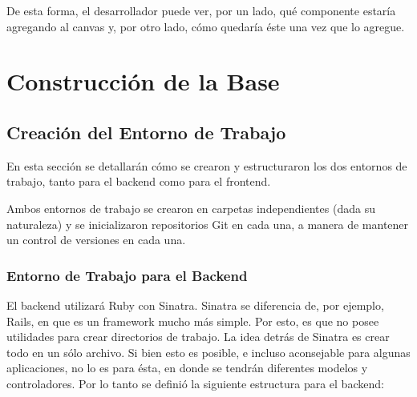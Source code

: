 \documentclass[12pt,spanish,letter]{report}
\begin{document}
De esta forma, el desarrollador puede ver, por un lado, qué componente
estaría agregando al canvas y, por otro lado, cómo quedaría éste una vez
que lo agregue.

\section{Construcción de la Base}

\label{section:first-stage}

\subsection{Creación del Entorno de Trabajo}

En esta sección se detallarán cómo se crearon y estructuraron los dos
entornos de trabajo, tanto para el backend como para el frontend.

Ambos entornos de trabajo se crearon en carpetas independientes (dada su
naturaleza) y se inicializaron repositorios Git en cada una, a manera de
mantener un control de versiones en cada una.

\subsubsection{Entorno de Trabajo para el Backend}

El backend utilizará Ruby con Sinatra. Sinatra se diferencia de, por
ejemplo, Rails, en que es un framework mucho más simple. Por esto, es
que no posee utilidades para crear directorios de trabajo. La idea
detrás de Sinatra es crear todo en un sólo archivo. Si bien esto es
posible, e incluso aconsejable para algunas aplicaciones, no lo es para
ésta, en donde se tendrán diferentes modelos y controladores. Por lo
tanto se definió la siguiente estructura para el backend:
\end{document}
